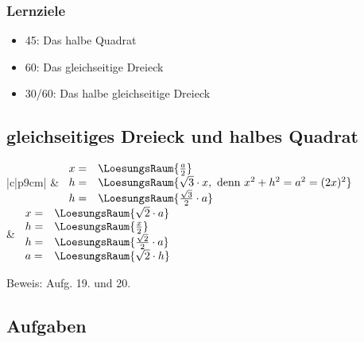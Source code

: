 \subsubsection*{Lernziele}
\begin{itemize}
\item 45\degre: Das halbe Quadrat
\item 60\degre: Das gleichseitige Dreieck
  \item 30\degre/60\degre: Das halbe gleichseitige Dreieck
\end{itemize}




\begin{samepage}
\subsection{gleichseitiges Dreieck und halbes Quadrat}

\begin{bbwFillInTabular}{|c|p{9cm}|} 
  \hline
   &
  $\begin{array}{ll}
    x=& \LoesungsRaum{\frac{a}{2}}                     \\
    h=& \LoesungsRaum{\sqrt{3}\cdot{}x, \text{ denn } x^2+h^2=a^2=(2x)^2}                \\
    h=& \LoesungsRaum{\frac{\sqrt{3}}{2}\cdot{}a}
  \end{array}$ \\

  \hline
   &
  $\begin{array}{ll}
    x=& \LoesungsRaum{\sqrt{2}\cdot{}a}            \\
    h=& \LoesungsRaum{\frac{x}{2}}                 \\
    h=& \LoesungsRaum{\frac{\sqrt{2}}{2} \cdot{} a}\\
    a=& \LoesungsRaum{\sqrt{2}\cdot{}h}
  \end{array}$ 
  \\
  
  \hline
\end{bbwFillInTabular} 

Beweis: Aufg. 19. und 20. \cite{marthaler20geom}


\end{samepage}

\subsection*{Aufgaben}
\newpage
